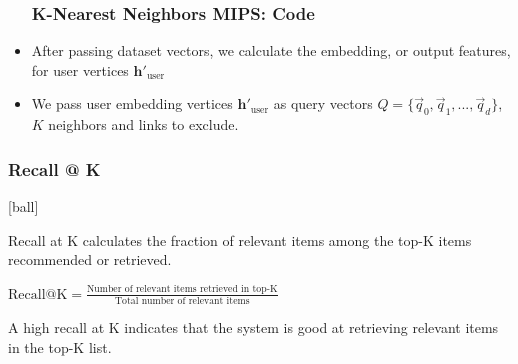 \documentclass{beamer}
\begin{document}
\begin{frame}[fragile]
\begin{itemize}
\frametitle{K-Nearest Neighbors MIPS: Code}

\vspace{-0.3cm}

\item After passing dataset vectors, we calculate the embedding, or output features, for user vertices $\mathbf{h'}_{\text{user}}$



\vspace{-0.3cm}

\item We pass user embedding vertices $\mathbf{h'}_{\text{user}}$ as query vectors $Q = \{\overrightarrow{q}_{0}, \overrightarrow{q}_{1}, ..., \overrightarrow{q}_{d} \}$, $K$ neighbors and links to exclude. 

\end{itemize}
\end{frame}


\begin{frame}[fragile]
\begin{itemize}
\frametitle{Recall @ K}
[ball]

\item Recall at K calculates the fraction of relevant items among the top-K items recommended or retrieved.

\vspace{0.5cm}

\begin{center}
    \item[] $\text{Recall@K} = \frac{\text{Number of relevant items retrieved in top-K}}{\text{Total number of relevant items}}$
\end{center}

\vspace{0.5cm}

\item A high recall at K indicates that the system is good at retrieving relevant items in the top-K list.

\end{itemize}
\end{frame}
\end{document}
